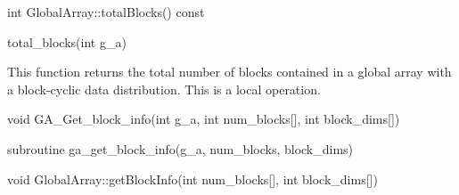 \documentclass[12pt]{article}
\begin{document}
\begin{cxxapi}
\begin{cxxcode}
int GlobalArray::totalBlocks() const
\end{cxxcode}
\end{cxxapi}

\begin{pyapi}
\begin{pycode}
total_blocks(int g_a)
\end{pycode}
\end{pyapi}
\local

\begin{desc}

This function returns the total number of blocks contained in a global array
with a block-cyclic data distribution. This is a local operation.

\end{desc}


\begin{capi}
\begin{ccode}
void GA_Get_block_info(int g_a, int num_blocks[], int block_dims[])
\end{ccode}
\begin{funcargs}
\end{funcargs}
\end{capi}

\begin{fapi}
\begin{fcode}
subroutine ga_get_block_info(g_a, num_blocks, block_dims)
\end{fcode}
\begin{funcargs}
\end{funcargs}
\end{fapi}

\begin{cxxapi}
\begin{cxxcode}
void GlobalArray::getBlockInfo(int num_blocks[], int block_dims[])
\end{cxxcode}
\begin{funcargs}
\end{funcargs}
\end{cxxapi}
\end{document}
